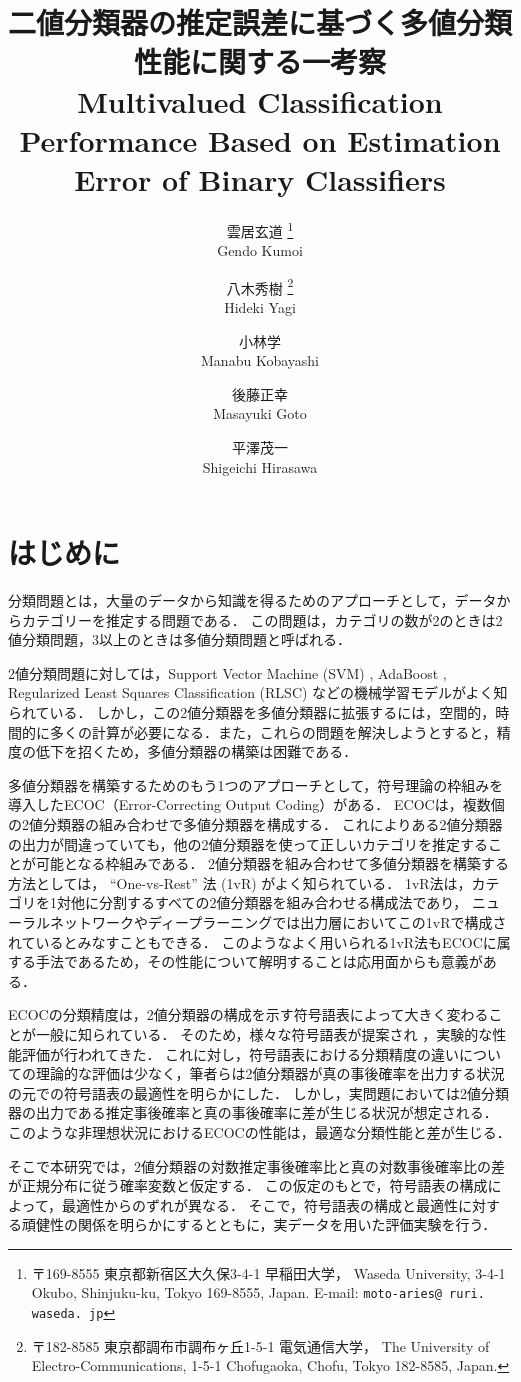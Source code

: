 \documentclass{jarticle}
\title{
  二値分類器の推定誤差に基づく多値分類性能に関する一考察\\
  	Multivalued Classification Performance Based on Estimation Error of Binary Classifiers
}
\author{
  雲居玄道
 \thanks{ %
  〒169-8555 東京都新宿区大久保3-4-1 早稲田大学，
 Waseda University, 3-4-1 Okubo, Shinjuku-ku, Tokyo 169-8555, Japan.
   E-mail: {\tt moto-aries@\allowbreak
      ruri.\allowbreak
      waseda.\allowbreak
      jp}
  }\\
  Gendo Kumoi
  \and
八木秀樹
  \thanks{
〒182-8585 東京都調布市調布ヶ丘1-5-1 電気通信大学，
The University of Electro-Communications, 1-5-1 Chofugaoka, Chofu, Tokyo 182-8585, Japan.
  }\\
%
Hideki Yagi
  \and
  小林学
  \samethanks {1}\\
  Manabu Kobayashi
  \and
  後藤正幸
  \samethanks {1}\\
  Masayuki Goto
  \and
  平澤茂一
  \samethanks {1}\\
  Shigeichi Hirasawa
}
\theoremstyle{definition}
\begin{document}
\maketitle

\section{はじめに}
分類問題とは，大量のデータから知識を得るためのアプローチとして，データからカテゴリーを推定する問題である．
この問題は，カテゴリの数が2のときは2値分類問題，3以上のときは多値分類問題と呼ばれる．

2値分類問題に対しては，Support Vector Machine (SVM) \cite{Vapnik1998-jd}, AdaBoost \cite{Freund1997-yz}, Regularized Least Squares Classification (RLSC) \cite{Rifkin2004-sk}などの機械学習モデルがよく知られている．
しかし，この2値分類器を多値分類器に拡張するには，空間的，時間的に多くの計算が必要になる．また，これらの問題を解決しようとすると，精度の低下を招くため，多値分類器の構築は困難である．

多値分類器を構築するためのもう1つのアプローチとして，符号理論の枠組みを導入したECOC（Error-Correcting Output Coding）\cite{Dietterich1994-mt}がある．
ECOCは，複数個の2値分類器の組み合わせで多値分類器を構成する．
これによりある2値分類器の出力が間違っていても，他の2値分類器を使って正しいカテゴリを推定することが可能となる枠組みである．
2値分類器を組み合わせて多値分類器を構築する方法としては， ``One-vs-Rest'' 法 (1vR) \cite{Rifkin2004-sk}がよく知られている．
1vR法は，カテゴリを1対他に分割するすべての2値分類器を組み合わせる構成法であり，
ニューラルネットワークやディープラーニングでは出力層においてこの1vRで構成されているとみなすこともできる．
このようなよく用いられる1vR法もECOCに属する手法であるため，その性能について解明することは応用面からも意義がある．

ECOCの分類精度は，2値分類器の構成を示す符号語表によって大きく変わることが一般に知られている．
そのため，様々な符号語表が提案され \cite{Dietterich1994-mt,Rifkin2004-sk,Escalera2010-pa,Rocha2014-ey,後藤正幸2014入門パターン認識と機械学習} ，実験的な性能評価が行われてきた．
これに対し，符号語表における分類精度の違いについての理論的な評価は少なく，筆者らは2値分類器が真の事後確率を出力する状況の元での符号語表の最適性を明らかにした\cite{雲居玄道2021最適性}．
しかし，実問題においては2値分類器の出力である推定事後確率と真の事後確率に差が生じる状況が想定される．
このような非理想状況におけるECOCの性能は，最適な分類性能と差が生じる．

そこで本研究では，2値分類器の対数推定事後確率比と真の対数事後確率比の差が正規分布に従う確率変数と仮定する．
この仮定のもとで，符号語表の構成によって，最適性からのずれが異なる．
そこで，符号語表の構成と最適性に対する頑健性の関係を明らかにするとともに，実データを用いた評価実験を行う．
\end{document}

